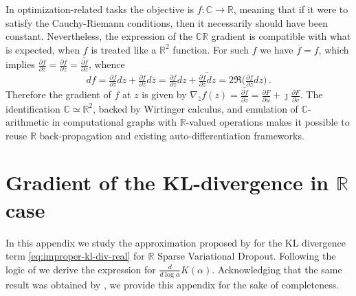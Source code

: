 \documentclass{article}
\newcommand{\real}{\mathbb{R}}
\newcommand{\cplx}{\mathbb{C}}
\newcommand{\iu}{{\jmath}}
\newcommand{\conj}[1]{\overline{#1}}
\begin{document}
In optimization-related tasks the objective is $
  f\colon \cplx\to \real
$, meaning that if it were to satisfy the Cauchy-Riemann conditions, then it necessarily
should have been constant. Nevertheless, the expression of the $\cplx\real$ gradient is
compatible with what is expected, when $f$ is treated like a $\real^2$ function. For such
$f$ we have $\conj{f} = f$, which implies $
  \tfrac{\partial f}{\partial \conj{z}}
    = \tfrac{\partial \conj{f}}{\partial \conj{z}}
    = \conj{\tfrac{\partial f}{\partial z}}
$, whence
\begin{equation*}
  df
    = \tfrac{\partial f}{\partial z} dz
      + \tfrac{\partial f}{\partial \conj{z}} d\conj{z}
    = \tfrac{\partial f}{\partial z} dz
      + \conj{\tfrac{\partial f}{\partial z} dz}
    = 2 \Re
      \bigl(
        \tfrac{\partial f}{\partial z} dz
      \bigr)
    \,.
\end{equation*}
Therefore the gradient of $f$ at $z$ is given by $
  \nabla_{\conj{z}} f(z)
    = \conj{\tfrac{\partial f}{\partial z}}
    = \tfrac{\partial F}{\partial u}
    + \iu \tfrac{\partial F}{\partial v}
$. The identification $\cplx \simeq \real^2$, backed by Wirtinger calculus, and emulation
of $\cplx$-arithmetic in computational graphs with $\real$-valued operations makes it
possible to reuse $\real$ back-propagation and existing auto-differentiation frameworks.


\section{Gradient of the KL-divergence in $\real$ case} %
\label{sec:real-chisq-grad}  %

In this appendix we study the approximation proposed by \citet{molchanov_variational_2017}
for the KL divergence term \eqref{eq:improper-kl-div-real} for $\real$ Sparse Variational
Dropout. Following the logic of \citet{lapidoth_capacity_2003} we derive the expression
for $
  \tfrac{d}{d\log \alpha} K(\alpha)
$. Acknowledging that the same result was obtained by \citet[eq.~(5)]{hron_variational_2018},
we provide this appendix for the sake of completeness.
\end{document}
